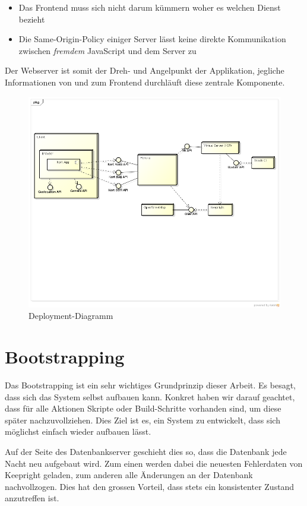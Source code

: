 \begin{itemize}
\item Das Frontend muss sich nicht darum kümmern woher es welchen Dienst bezieht
\item Die Same-Origin-Policy\cite{sop} einiger Server lässt keine direkte Kommunikation zwischen \emph{fremdem} JavaScript und dem Server zu
\end{itemize}

Der Webserver ist somit der Dreh- und Angelpunkt der Applikation, jegliche Informationen von und zum Frontend durchläuft diese zentrale Komponente.

\begin{figure}[H]
	\centering
	\includegraphics[width=\textwidth]{images/uml/deployment_diagram}
	\caption{Deployment-Diagramm}
	\label{deplyoyment-diagram}
\end{figure}

\section{Bootstrapping}
Das \gls{Bootstrapping} ist ein sehr wichtiges Grundprinzip dieser Arbeit.
Es besagt, dass sich das System selbst aufbauen kann.
Konkret haben wir darauf geachtet, dass für alle Aktionen Skripte oder Build-Schritte vorhanden sind, um diese später nachzuvollziehen.
Dies Ziel ist es, ein System zu entwickelt, dass sich möglichst einfach wieder aufbauen lässt.

Auf der Seite des Datenbankserver geschieht dies so, dass die Datenbank jede Nacht neu aufgebaut wird.
Zum einen werden dabei die neuesten Fehlerdaten von Keepright geladen, zum anderen alle Änderungen an der Datenbank nachvollzogen.
Dies hat den grossen Vorteil, dass stets ein konsistenter Zustand anzutreffen ist.

